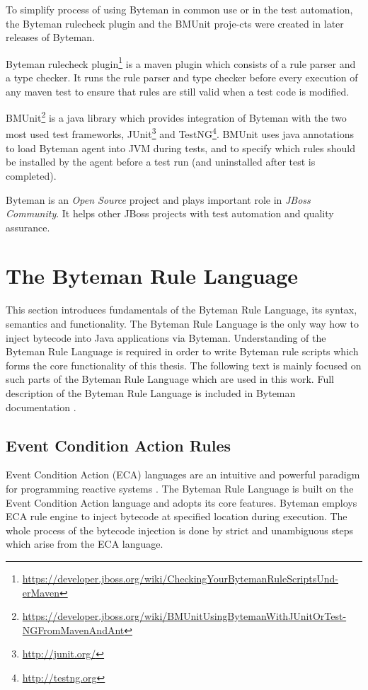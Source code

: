 \documentclass[12pt,oneside]{fithesis2}
\begin{document}
To simplify process of using Byteman in common use or in the test automation, the Byteman rulecheck plugin and the BMUnit proje-cts were created in later releases of Byteman.

Byteman rulecheck plugin\footnote{\url{https://developer.jboss.org/wiki/CheckingYourBytemanRuleScriptsUnd-erMaven}} is a maven plugin which consists of a rule parser and a type checker. It runs the rule parser and type checker before every execution of any maven test to ensure that rules are still valid when a test code is modified.

BMUnit\footnote{\url{https://developer.jboss.org/wiki/BMUnitUsingBytemanWithJUnitOrTest-NGFromMavenAndAnt}} is a java library which provides integration of Byteman with the two most used test frameworks, JUnit\footnote{\url{http://junit.org/}} and TestNG\footnote{\url{http://testng.org}}. BMUnit uses java annotations to load Byteman agent into JVM during tests, and to specify which rules should be installed by the agent before a test run (and uninstalled after test is completed).

Byteman is an \textit{Open Source} project and plays important role in \textit{JBoss Community}. It helps other JBoss projects with test automation and quality assurance.

\section{The Byteman Rule Language}
This section introduces fundamentals of the Byteman Rule Language, its syntax, semantics and functionality. The Byteman Rule Language is the only way how to inject bytecode into Java applications via Byteman. Understanding of the Byteman Rule Language is required in order to write Byteman rule scripts which forms the core functionality of this thesis. The following text is mainly focused on such parts of the Byteman Rule Language which are used in this work. Full description of the Byteman Rule Language is included in Byteman documentation \cite[The Byteman Rule Language]{byteman_doc}.

\subsection{Event Condition Action Rules}
\label{subsec:eca_sec}
Event Condition Action (ECA) languages are an intuitive and powerful paradigm for programming reactive systems \cite{eca}. The Byteman Rule Language is built on the Event Condition Action language and adopts its core features. Byteman employs ECA rule engine to inject bytecode at specified location during execution. The whole process of the bytecode injection is done by strict and unambiguous steps which arise from the ECA language.
\end{document}
